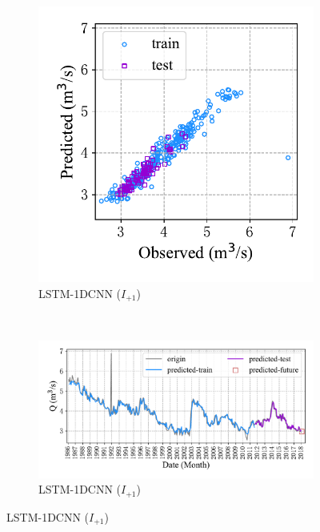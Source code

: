 \begin{figure}[!htbp]
  \centering
  \begin{subfigure}[b]{0.305\textwidth}
    \includegraphics[width=\textwidth]{Img/chap4_spr/out1/spr_scatter_in_1_out_1_lstm_cnn.pdf}
    \vspace{-1.2cm}
    \caption{LSTM-1DCNN ($I_{+1}$)}
    \label{fig:spr_scatter_in_1_out_1_lstm_cnn}
  \end{subfigure}
  ~
  \begin{subfigure}[b]{0.615\textwidth}
    \includegraphics[width=\textwidth]{Img/chap4_spr/out1/spr_series_in_1_out_1_lstm_cnn.pdf}
    \vspace{-1.2cm}
    \caption{LSTM-1DCNN ($I_{+1}$)}
    \label{fig:spr_series_in_1_out_1_lstm_cnn}

\end{subfigure}
\end{figure}
